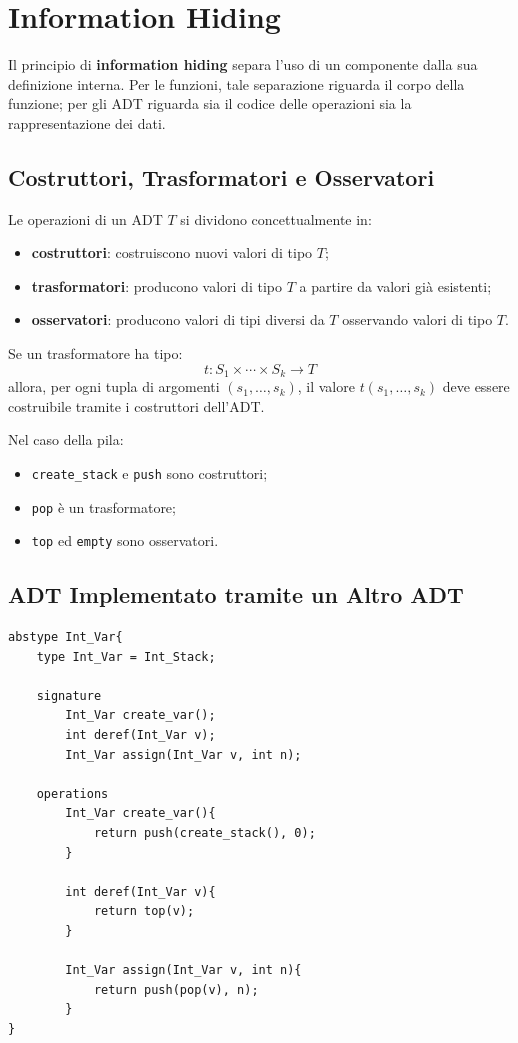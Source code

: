 \documentclass{article}
\begin{document}
\section{Information Hiding}

Il principio di \textbf{information hiding} separa l'uso di un componente dalla sua definizione interna. Per le funzioni, tale separazione riguarda il corpo della funzione; per gli ADT riguarda sia il codice delle operazioni sia la rappresentazione dei dati.

\subsection{Costruttori, Trasformatori e Osservatori}

Le operazioni di un ADT $T$ si dividono concettualmente in:
\begin{itemize}
  \item \textbf{costruttori}: costruiscono nuovi valori di tipo $T$;
  \item \textbf{trasformatori}: producono valori di tipo $T$ a partire da valori già esistenti;
  \item \textbf{osservatori}: producono valori di tipi diversi da $T$ osservando valori di tipo $T$.
\end{itemize}

Se un trasformatore ha tipo:
\[
t : S_1 \times \cdots \times S_k \to T
\]
allora, per ogni tupla di argomenti $(s_1,\ldots,s_k)$, il valore $t(s_1,\ldots,s_k)$ deve essere costruibile tramite i costruttori dell'ADT.

Nel caso della pila:
\begin{itemize}
  \item \texttt{create\_stack} e \texttt{push} sono costruttori;
  \item \texttt{pop} è un trasformatore;
  \item \texttt{top} ed \texttt{empty} sono osservatori.
\end{itemize}

\subsection{ADT Implementato tramite un Altro ADT}

\begin{lstlisting}
abstype Int_Var{
    type Int_Var = Int_Stack;

    signature
        Int_Var create_var();
        int deref(Int_Var v);
        Int_Var assign(Int_Var v, int n);

    operations
        Int_Var create_var(){
            return push(create_stack(), 0);
        }

        int deref(Int_Var v){
            return top(v);
        }

        Int_Var assign(Int_Var v, int n){
            return push(pop(v), n);
        }
}
\end{lstlisting}
\end{document}
